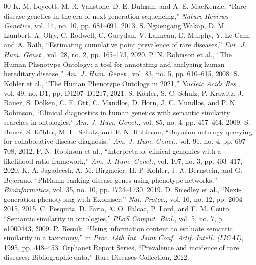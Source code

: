 \documentclass[conference]{IEEEtran}
\begin{document}
\begin{thebibliography}{00}
 K. M. Boycott, M. R. Vanstone, D. E. Bulman, and A. E. MacKenzie, ``Rare-disease genetics in the era of next-generation sequencing,'' \textit{Nature Reviews Genetics}, vol. 14, no. 10, pp. 681--691, 2013.
 S. Nguengang Wakap, D. M. Lambert, A. Olry, C. Rodwell, C. Gueydan, V. Lanneau, D. Murphy, Y. Le Cam, and A. Rath, ``Estimating cumulative point prevalence of rare diseases,'' \textit{Eur. J. Hum. Genet.}, vol. 28, no. 2, pp. 165--173, 2020.
 P. N. Robinson et al., ``The Human Phenotype Ontology: a tool for annotating and analyzing human hereditary disease,'' \textit{Am. J. Hum. Genet.}, vol. 83, no. 5, pp. 610--615, 2008.
 S. K{\"o}hler et al., ``The Human Phenotype Ontology in 2021,'' \textit{Nucleic Acids Res.}, vol. 49, no. D1, pp. D1207--D1217, 2021.
 S. K{\"o}hler, S. C. Schulz, P. Krawitz, J. Bauer, S. D{\"o}lken, C. E. Ott, C. Mundlos, D. Horn, J. C. Mundlos, and P. N. Robinson, ``Clinical diagnostics in human genetics with semantic similarity searches in ontologies,'' \textit{Am. J. Hum. Genet.}, vol. 85, no. 4, pp. 457--464, 2009.
 S. Bauer, S. K{\"o}hler, M. H. Schulz, and P. N. Robinson, ``Bayesian ontology querying for collaborative disease diagnosis,'' \textit{Am. J. Hum. Genet.}, vol. 91, no. 4, pp. 697--708, 2012.
 P. N. Robinson et al., ``Interpretable clinical genomics with a likelihood ratio framework,'' \textit{Am. J. Hum. Genet.}, vol. 107, no. 3, pp. 403--417, 2020.
 K. A. Jagadeesh, A. M. Birgmeier, H. P. Kohler, J. A. Bernstein, and G. Bejerano, ``PhRank: ranking disease genes using phenotype networks,'' \textit{Bioinformatics}, vol. 35, no. 10, pp. 1724--1730, 2019.
 D. Smedley et al., ``Next-generation phenotyping with Exomiser,'' \textit{Nat. Protoc.}, vol. 10, no. 12, pp. 2004--2015, 2015.
 C. Pesquita, D. Faria, A. O. Falcao, P. Lord, and F. M. Couto, ``Semantic similarity in ontologies,'' \textit{PLoS Comput. Biol.}, vol. 5, no. 7, p. e1000443, 2009.
 P. Resnik, ``Using information content to evaluate semantic similarity in a taxonomy,'' in \textit{Proc. 14th Int. Joint Conf. Artif. Intell. (IJCAI)}, 1995, pp. 448--453.
 Orphanet Report Series, ``Prevalence and incidence of rare diseases: Bibliographic data,'' Rare Diseases Collection, 2022.

\end{thebibliography}
\end{document}
